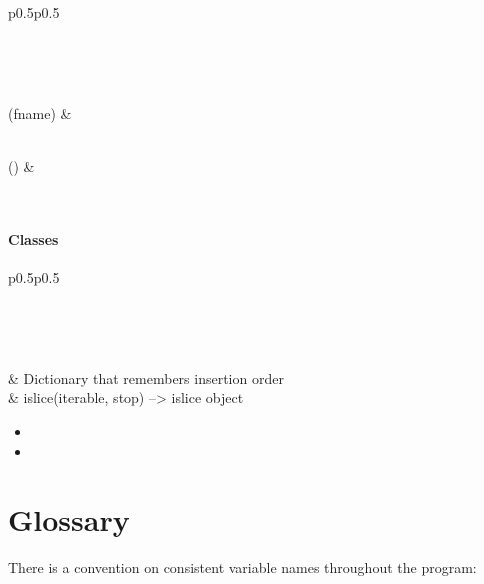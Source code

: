 \documentclass[letterpaper,10pt,english]{sphinxmanual}
\begin{document}
\begin{longtable}{p{0.5\linewidth}p{0.5\linewidth}}
\hline
\endfirsthead

%
{{}} \\
\hline
\endhead

\hline {} \\ \hline
\endfoot

\endlastfoot


(fname)
&

\\
\hline
{}()
&

\\
\hline\end{longtable}

\paragraph{Classes}

\begin{longtable}{p{0.5\linewidth}p{0.5\linewidth}}
\hline
\endfirsthead

%
{{}} \\
\hline
\endhead

\hline {} \\ \hline
\endfoot

\endlastfoot


&
Dictionary that remembers insertion order
\\
\hline
{}
&
islice(iterable, stop) --\textgreater{} islice object
\\
\hline\end{longtable}

\begin{itemize}
\item {} 

\item {} 

\end{itemize}


\section{Glossary}
\label{\detokenize{variables_style_rules:glossary}}\label{\detokenize{variables_style_rules::doc}}\label{\detokenize{variables_style_rules:variables-style-rules}}
There is a convention on consistent variable names throughout the program:
\end{document}
